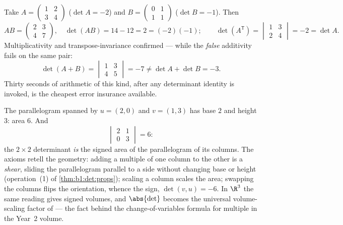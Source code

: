 \begin{example}
\label{ex:b1:det:rulescheck}
Take $A = \begin{pmatrix} 1 & 2\\ 3 & 4\end{pmatrix}$ ($\det A =
-2$) and $B = \begin{pmatrix} 0 & 1\\ 1 & 1\end{pmatrix}$ ($\det
B = -1$). Then
\[
AB = \begin{pmatrix} 2 & 3\\ 4 & 7\end{pmatrix},
\quad \det(AB) = 14 - 12 = 2 = (-2)(-1) ;
\qquad
\det(A^{\mathsf T}) = \begin{vmatrix} 1 & 3\\ 2 & 4
\end{vmatrix} = -2 = \det A .
\]
Multiplicativity and transpose-invariance confirmed --- while
the \emph{false} additivity fails on the same pair:
\[
\det(A + B) = \begin{vmatrix} 1 & 3\\ 4 & 5\end{vmatrix} = -7
\neq \det A + \det B = -3 .
\]
Thirty seconds of arithmetic of this kind, after any determinant
identity is invoked, is the cheapest error insurance available.
\end{example}

\begin{example}
\label{ex:b1:det:area}
The parallelogram spanned by $u = (2, 0)$ and $v = (1, 3)$ has
base $2$ and height $3$: area $6$. And
\[
\begin{vmatrix} 2 & 1\\ 0 & 3\end{vmatrix} = 6 :
\]
the $2\times2$ determinant \emph{is} the signed area of the
parallelogram of its columns. The axioms retell the geometry:
adding a multiple of one column to the other is a \emph{shear},
sliding the parallelogram parallel to a side without changing
base or height (operation~(1) of \cref{thm:b1:det:props});
scaling a column scales the area; swapping the columns flips
the orientation, whence the sign, $\det(v, u) = -6$. In $\R^3$
the same reading gives signed volumes, and $\abs{\det}$ becomes
the universal volume-scaling factor of  --- the fact
behind the change-of-variables formula for multiple 
in the Year~2 volume.
\end{example}

